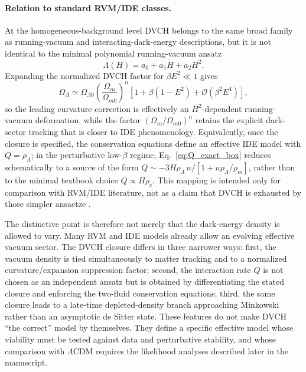 \documentclass[pdflatex,sn-mathphys-num]{sn-jnl}%
\newcommand{\Omm}{\Omega_{m0}}
\newcommand{\OmL}{\Omega_{\Lambda0}}
\begin{document}
\paragraph{Relation to standard RVM/IDE classes.}
At the homogeneous-background level DVCH belongs to the same broad family as
running-vacuum and interacting-dark-energy descriptions, but it is not identical
to the minimal polynomial running-vacuum ansatz
\begin{equation}
\Lambda(H)=a_0+a_1\dot H+a_2H^2.
\label{eq:rvm_reference_form}
\end{equation}
Expanding the normalized DVCH factor for $\beta E^2\ll1$ gives
\begin{equation}
\Omega_\Lambda\simeq \OmL\left(\frac{\Omega_m}{\Omm}\right)^n
\left[1+\beta\left(1-E^2\right)+\mathcal{O}(\beta^2E^4)\right],
\label{eq:dvch_rvm_expansion}
\end{equation}
so the leading curvature correction is effectively an $H^2$-dependent
running-vacuum deformation, while the factor $(\Omega_m/\Omm)^n$ retains the
explicit dark-sector tracking that is closer to IDE phenomenology. Equivalently,
once the closure is specified, the conservation equations define an effective
IDE model with $Q=\dot\rho_\Lambda$; in the perturbative low-$\beta$ regime,
Eq.~\eqref{eq:Q_exact_box} reduces schematically to a source of the form
$Q\sim -3H\rho_\Lambda\,n/[1+n\rho_\Lambda/\rho_m]$, rather than to the
minimal textbook choice $Q\propto H\rho_c$. This mapping is intended only for
comparison with RVM/IDE literature, not as a claim that DVCH is exhausted by
those simpler ansaetze \cite{Sola:2017znb,Nunes:2022bov,Pan:2021dxa}.

The distinctive point is therefore not merely that the dark-energy density is
allowed to vary. Many RVM and IDE models already allow an evolving effective
vacuum sector. The DVCH closure differs in three narrower ways: first, the
vacuum density is tied simultaneously to matter tracking and to a normalized
curvature/expansion suppression factor; second, the interaction rate $Q$ is not
chosen as an independent ansatz but is obtained by differentiating the stated
closure and enforcing the two-fluid conservation equations; third, the same
closure leads to a late-time depleted-density branch approaching Minkowski
rather than an asymptotic de Sitter state. These features do not make DVCH
``the correct'' model by themselves. They define a specific effective model
whose viability must be tested against data and perturbative stability, and
whose comparison with $\Lambda$CDM requires the likelihood analyses described
later in the manuscript.
\end{document}
